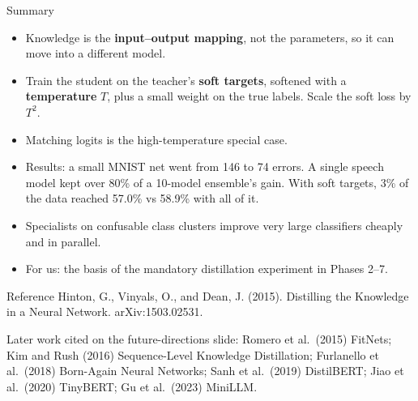 \documentclass[aspectratio=169,11pt]{beamer}
\begin{document}
\begin{frame}{Summary}
  \begin{itemize}
    \item Knowledge is the \textbf{input--output mapping}, not the parameters, so it can move into a different model.
    \item Train the student on the teacher's \textbf{soft targets}, softened with a \textbf{temperature} $T$, plus a small weight on the true labels. Scale the soft loss by $T^2$.
    \item Matching logits is the high-temperature special case.
    \item Results: a small MNIST net went from 146 to 74 errors. A single speech model kept over 80\% of a 10-model ensemble's gain. With soft targets, 3\% of the data reached 57.0\% vs 58.9\% with all of it.
    \item Specialists on confusable class clusters improve very large classifiers cheaply and in parallel.
    \item For us: the basis of the mandatory distillation experiment in Phases 2--7.
  \end{itemize}
\end{frame}

\begin{frame}{Reference}
  \small
  Hinton, G., Vinyals, O., and Dean, J. (2015). Distilling the Knowledge in a Neural Network. arXiv:1503.02531.
  \vspace{3mm}

  {\footnotesize Later work cited on the future-directions slide: Romero et al.\ (2015) FitNets; Kim and Rush (2016) Sequence-Level Knowledge Distillation; Furlanello et al.\ (2018) Born-Again Neural Networks; Sanh et al.\ (2019) DistilBERT; Jiao et al.\ (2020) TinyBERT; Gu et al.\ (2023) MiniLLM.}
\end{frame}
\end{document}
